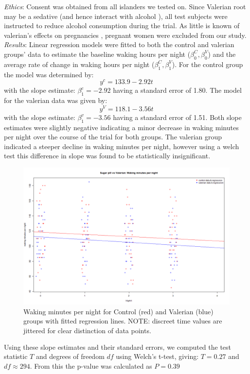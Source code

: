 \documentclass[10pt,preprintnumbers,amsmath,amssymb,floatfix,twocolumn,prl]{revtex4-2}
\begin{document}
\textit{Ethics}: Consent was obtained from all islanders we tested on. Since Valerian root may be a sedative (and hence interact with alcohol \cite{ValerianSource1}), all test subjects were instructed to reduce alcohol consumption during the trial. As little is known of valerian's effects on pregnancies \cite{ValerianSource2}, pregnant women were excluded from our study. \\

\textit{Results}: Linear regression models were fitted to both the control and valerian groups' data to estimate the baseline waking hours per night ($\beta_0^C, \beta_0^V$) and the average rate of change in waking hours per night ($\beta_1^C, \beta_1^V$). For the control group the model was determined by:
$$
y^c = 133.9 - 2.92 t
$$
with the slope estimate: $\beta_1^c = - 2.92$ having a standard error of 1.80.
The model for the valerian data was given by: 
$$
y^V = 118.1 - 3.56 t
$$
with the slope estimate: $\beta_1^v = - 3.56$ having a standard error of 1.51.
Both slope estimates were slightly negative indicating a minor decrease in waking minutes per night over the course of the trial for both groups. The valerian group indicated a steeper decline in waking minutes per night, however using a welch test this difference in slope was found to be statistically insignificant. 
\begin{figure}[H]
\centering
\includegraphics[width=0.95\linewidth]{linear_reg.png}
\caption{Waking minutes per night for Control (red) and Valerian (blue) groups with fitted regression lines. NOTE: discreet time values are jittered for clear distinction of data points.}
\end{figure}
Using these slope estimates and their standard errors, we computed the test statistic $T$ and degrees of freedom $df$ using Welch's t-test, giving: $T = 0.27$ and $df \approx 294$. From this the p-value was calculated as $P = 0.39$
\end{document}
